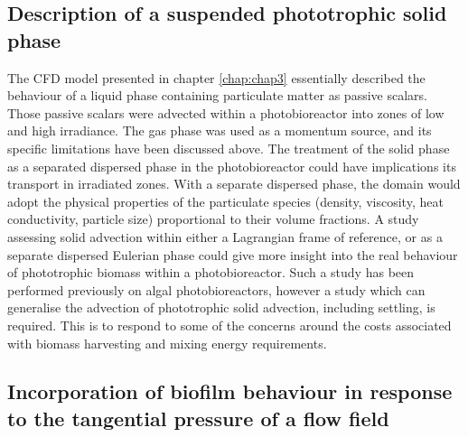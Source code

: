 \subsection{Description of a suspended phototrophic solid phase}
The CFD model presented in chapter \ref{chap:chap3} essentially described the behaviour of a liquid phase containing particulate matter as passive scalars. Those passive scalars were advected within a photobioreactor into zones of low and high irradiance. The gas phase was used as a momentum source, and its specific limitations have been discussed above. The treatment of the solid phase as a separated dispersed phase in the photobioreactor could have implications its transport in irradiated zones. With a separate dispersed phase, the domain would adopt the physical properties of the particulate species (density, viscosity, heat conductivity, particle size) proportional to their volume fractions. A study assessing solid advection within either a Lagrangian frame of reference, or as a separate dispersed Eulerian phase could give more insight into the real behaviour of phototrophic biomass within a photobioreactor. Such a study has been performed previously \cite{Gao2016} on algal photobioreactors, however a study which can generalise the advection of phototrophic solid advection, including settling, is required. This is to respond to some of the concerns around the costs associated with biomass harvesting and mixing energy requirements. 

\subsection{Incorporation of biofilm behaviour in response to the tangential pressure of a flow field}


